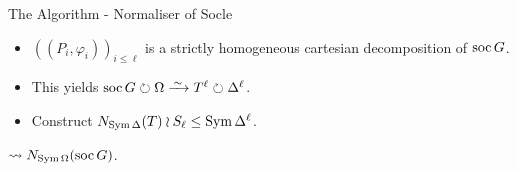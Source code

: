 \begin{frame}{The Algorithm - Normaliser of Socle}
    \begin{itemize}
        \setlength\itemsep{\fill}
        \item
        $((P_i, \varphi_i))_{i \leq \ell}$
        is a strictly homogeneous cartesian decomposition of $\operatorname{soc} G$.
        \pause
        \item
        This yields
        $\soc G \circlearrowright \Omega
        \iso
        T ^ \ell \circlearrowright \Delta ^ \ell$.
        \pause
        \item
        Construct $N_{\operatorname{Sym} \Delta}(T) \wr S_\ell \leq \operatorname{Sym} \Delta ^ \ell$.
    \end{itemize}
    \pause
    $\leadsto N_{\operatorname{Sym} \Omega}(\operatorname{soc} G)$.
\end{frame}

